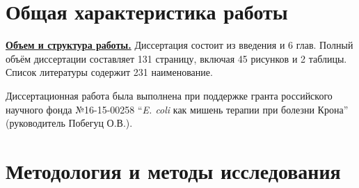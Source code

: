 \section*{Общая характеристика работы}
\newcommand{\actuality}{\pdfbookmark[1]{Актуальность и разработанность темы}{actuality}\underline{\textbf{\actualityTXT}}}
\newcommand{\aim}{\pdfbookmark[1]{Цели}{aim}\underline{{\textbf\aimTXT}}}
\newcommand{\tasks}{\pdfbookmark[1]{Задачи}{tasks}\underline{\textbf{\tasksTXT}}}
\newcommand{\aimtasks}{\pdfbookmark[1]{Цели и задачи}{aimtasks}\aimtasksTXT}
\newcommand{\novelty}{\pdfbookmark[1]{Научная новизна}{novelty}\underline{\textbf{\noveltyTXT}}}
\newcommand{\influence}{\pdfbookmark[1]{Практическая значимость}{influence}\underline{\textbf{\influenceTXT}}}
\newcommand{\defpositions}{\pdfbookmark[1]{Положения, выносимые на защиту}{defpositions}\underline{\textbf{\defpositionsTXT}}}
\newcommand{\reliability}{\pdfbookmark[1]{Достоверность}{reliability}\underline{\textbf{\reliabilityTXT}}}
\newcommand{\contribution}{\pdfbookmark[1]{Личный вклад}{contribution}\underline{\textbf{\contributionTXT}}}
\newcommand{\publications}{\pdfbookmark[1]{Публикации}{publications}\underline{\textbf{\publicationsTXT}}}


\underline{\textbf{Объем и структура работы.}} Диссертация состоит из введения и 6 глав.
Полный объём диссертации составляет 131 страницу, включая 45 рисунков и 2 таблицы. Список литературы содержит 231 наименование.

Диссертационная работа была выполнена при поддержке гранта российского научного фонда №16-15-00258 ``\textit{E. coli} как мишень терапии при болезни Крона'' (руководитель Побегуц О.В.).


\section*{Методология и методы исследования}

